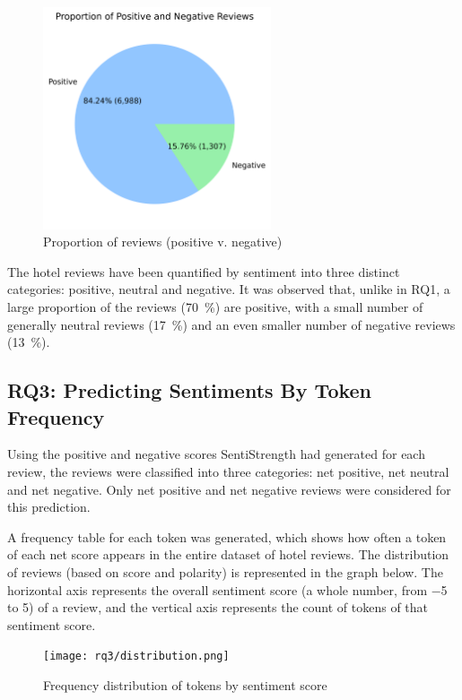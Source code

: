 \documentclass[12pt, bibliography=totocnumbered, paper=a4]{scrartcl}
\begin{document}
\begin{figure}[htpb]
	\begin{center}
		\includegraphics[width=0.6\textwidth]{rq2/pie_chart_2part.png}
	\end{center}
	\caption{Proportion of reviews (positive v. negative)}
	\label{fig:reviews-pie4}
\end{figure}

The hotel reviews have been quantified by sentiment into three distinct categories:
positive, neutral and negative. It was observed that, unlike in RQ1, a large proportion
of the reviews (\qty{70}{\percent}) are positive, with a small number of generally neutral reviews (\qty{17}{\percent})
and an even smaller number of negative reviews (\qty{13}{\percent}).

\subsection{RQ3: Predicting Sentiments By Token Frequency}
Using the positive and negative scores SentiStrength had generated for
each review, the reviews were classified into three categories: net positive,
net neutral and net negative. Only net positive and net negative reviews were
considered for this prediction.

A frequency table for each token was generated, which shows
how often a token of each net score appears in the entire dataset
of hotel reviews. The distribution of reviews (based on score and
polarity) is represented in the graph below. The horizontal axis represents
the overall sentiment score (a whole number, from \num{-5} to \num{5}) of a review,
and the vertical axis represents the count of tokens of that sentiment score.

\begin{figure}[htpb]
	\begin{center}
		\texttt{[image: rq3/distribution.png]}
	\end{center}
	\caption{Frequency distribution of tokens by sentiment score}
	\label{fig:hist}
\end{figure}
\end{document}
